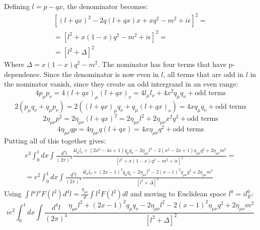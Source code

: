 \documentclass{article}
\begin{document}
Defining $l = p - qx$, the denominator becomes:
\begin{equation}
\begin{gathered}
    \left[(l + qx)^2 - 2q(l + qx)x + xq^2 - m^2 + i\epsilon\right]^2 = \\ =
    \left[l^2 + x(1 - x)q^2 - m^2 + i\epsilon\right]^2 = \\ =
    \left[l^2 + \Delta\right]^2
\end{gathered}
\end{equation}
Where $\Delta = x(1 - x)q^2 - m^2$. The nominator has four terms that have p-dependence. Since the denominator is now even in $l$, all terms that are odd in $l$ in the nominator vanish, since they create an odd intergrand in an even range:
\begin{equation}
    4p_\mu p_\nu = 4(l + qx)_\mu (l + qx)_\nu = 4l_\mu l_\nu + 4x^2 q_\mu q_\nu + \text{odd terms}
\end{equation}
\begin{equation}
    2(p_\mu q_\nu + q_\mu p_\nu) = 2((l + qx)_\mu q_\nu + q_\mu (l + qx)_\nu) = 4x q_\mu q_\nu + \text{odd terms}
\end{equation}
\begin{equation}
    2\eta_{\mu\nu} p^2 = 2\eta_{\mu\nu} (l + qx)^2 = 2\eta_{\mu\nu} l^2 + 2\eta_{\mu\nu} x^2q^2 + \text{odd terms}
\end{equation}
\begin{equation}
    4\eta_{\mu\nu}qp = 4\eta_{\mu\nu}q(l + qx) = 4x\eta_{\mu\nu}q^2 + \text{odd terms} 
\end{equation}
Putting all of this together gives:
\begin{equation}
\begin{gathered}
    e^2 \int_0^1 dx \int \frac{d^4 l}{(2\pi)^4}
    \frac{4 l_\mu l_\nu + (2x^2 - 4x + 1)q_\mu q_\nu - 2\eta_{\mu\nu} l^2 - 2(x^2 - 2x + 1) \eta_{\mu\nu} q^2 + 2\eta_{\mu\nu} m^2}{\left[l^2 + x(1 - x)q^2 - m^2 + i\epsilon\right]^2} = \\ =
    e^2 \int_0^1 dx \int \frac{d^4 l}{(2\pi)^4}
    \frac{4 l_\mu l_\nu + (2x - 1)^2q_\mu q_\nu - 2\eta_{\mu\nu} l^2 - 2(x - 1)^2 \eta_{\mu\nu} q^2 + 2\eta_{\mu\nu} m^2}{\left[l^2 + \Delta\right]^2}
\end{gathered}
\end{equation}
Using $\int l^\mu l^\nu F(l^2)d^dl = \frac{\eta_{\mu\nu}}{d}\int l^2 F(l^2)dl$ and moving to Euclidean space $l^0 = il^0_E$:
\begin{equation}
    i e^2 \int_0^1 dx \int \frac{d^4 l}{(2\pi)^4}
    \frac{\eta_{\mu\nu} l^2 + (2x - 1)^2q_\mu q_\nu - 2\eta_{\mu\nu} l^2 - 2(x - 1)^2 \eta_{\mu\nu} q^2 + 2\eta_{\mu\nu} m^2}{\left[l^2 + \Delta\right]^2}
\end{equation}
\end{document}
